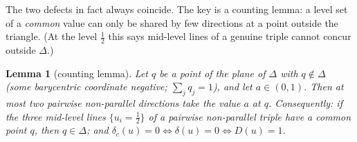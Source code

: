 \documentclass[11pt,reqno]{amsart}
\theoremstyle{plain}
\newtheorem{lemma}[theorem]{Lemma}
\theoremstyle{definition}
\theoremstyle{remark}
\begin{document}
The two defects in fact always coincide. The key is a counting lemma: a
level set of a \emph{common} value can only be shared by few directions at a
point outside the triangle. (At the level $\tfrac12$ this says mid-level
lines of a genuine triple cannot concur outside $\Delta$.)

\begin{lemma}[counting lemma]\label{lem:external}
Let $q$ be a point of the plane of $\Delta$ with $q\notin\Delta$ (some
barycentric coordinate negative; $\sum_jq_j=1$), and let $a\in(0,1)$. Then at
most \emph{two} pairwise non-parallel directions take the value $a$ at $q$.
Consequently: if the three mid-level lines $\{u_i=\tfrac12\}$ of a pairwise
non-parallel triple have a common point $q$, then $q\in\Delta$; and
$\delta_c(u)=0\iff\delta(u)=0\iff D(u)=1$.
\end{lemma}
\end{document}
